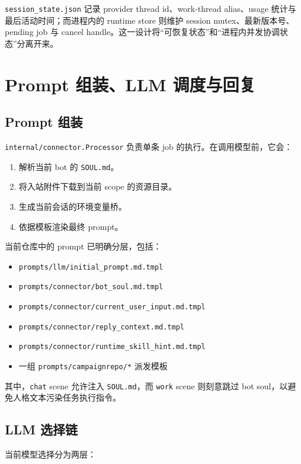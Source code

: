 \documentclass[12pt,a4paper]{ctexart}
\begin{document}
\texttt{session\_state.json} 记录 provider thread id、work-thread alias、usage 统计与最后活动时间；而进程内的 runtime store 则维护 session mutex、最新版本号、pending job 与 cancel handle。这一设计将“可恢复状态”和“进程内并发协调状态”分离开来。

\section{Prompt 组装、LLM 调度与回复}

\subsection{Prompt 组装}

\texttt{internal/connector.Processor} 负责单条 job 的执行。在调用模型前，它会：

\begin{enumerate}
  \item 解析当前 bot 的 \texttt{SOUL.md}。
  \item 将入站附件下载到当前 scope 的资源目录。
  \item 生成当前会话的环境变量桥。
  \item 依据模板渲染最终 prompt。
\end{enumerate}

当前仓库中的 prompt 已明确分层，包括：

\begin{itemize}
  \item \texttt{prompts/llm/initial\_prompt.md.tmpl}
  \item \texttt{prompts/connector/bot\_soul.md.tmpl}
  \item \texttt{prompts/connector/current\_user\_input.md.tmpl}
  \item \texttt{prompts/connector/reply\_context.md.tmpl}
  \item \texttt{prompts/connector/runtime\_skill\_hint.md.tmpl}
  \item 一组 \texttt{prompts/campaignrepo/*} 派发模板
\end{itemize}

其中，\texttt{chat} scene 允许注入 \texttt{SOUL.md}，而 \texttt{work} scene 则刻意跳过 bot soul，以避免人格文本污染任务执行指令。

\subsection{LLM 选择链}

当前模型选择分为两层：
\end{document}
